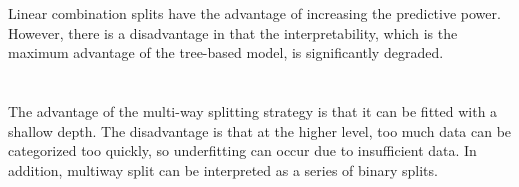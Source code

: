 \documentclass[11pt,a4paper]{article}
\begin{document}
Linear combination splits have the advantage of increasing the predictive power. However, there is a disadvantage in that the interpretability, which is the maximum advantage of the tree-based model, is significantly degraded.

\section{}

The advantage of the multi-way splitting strategy is that it can be fitted with a shallow depth. The disadvantage is that at the higher level, too much data can be categorized too quickly, so underfitting can occur due to insufficient data. In addition, multiway split can be interpreted as a series of binary splits.
\end{document}
